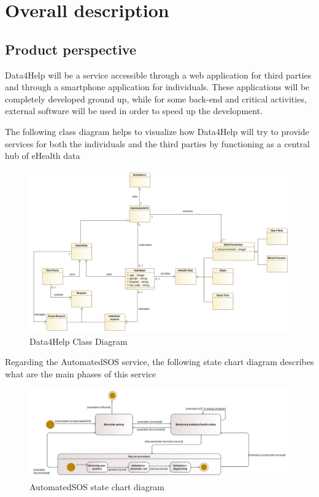 \chapter{Overall description}
\section{Product perspective}
Data4Help will be a service accessible through a web application for third parties and through a smartphone application for individuals. These applications will be completely developed ground up, while for some back-end and critical activities, external software will be used in order to speed up the development.


The following class diagram helps to visualize how Data4Help will try to provide services for both the individuals and the third parties by functioning as a central hub of eHealth data

\begin{figure}[H]
  \includegraphics[width=1.05\linewidth]{resources/UML/Data4HelpClassDiagram.png}
  \caption{Data4Help Class Diagram}
  \label{fig: Data4Help Class diagram}
\end{figure}

Regarding the AutomatedSOS service, the following state chart diagram describes what are the main phases of this service

\begin{figure}[H]
  \includegraphics[width=1.10\linewidth]{resources/UML/AutomatedSOSstatechart.png}
  \caption{AutomatedSOS state chart diagram}
  \label{fig: AutoamtedSOS state chart diagram}
\end{figure}


